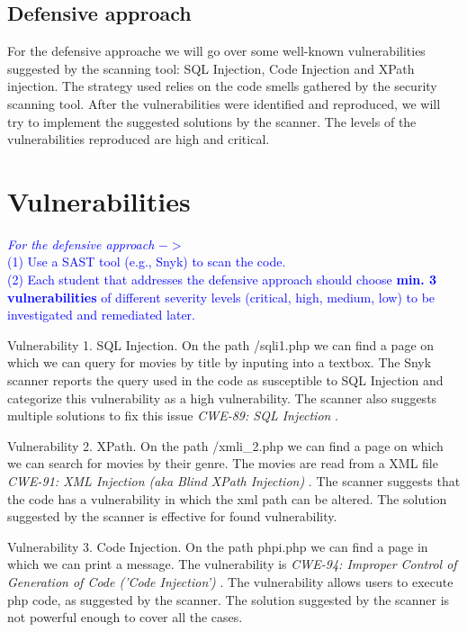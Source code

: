\documentclass{article}
\begin{document}
\subsection{Defensive approach}
\par For the defensive approache we will go over some well-known vulnerabilities suggested by the scanning tool: SQL Injection, Code Injection and XPath injection. The strategy used relies on the code smells gathered by the security scanning tool. After the vulnerabilities were identified and reproduced, we will try to implement the suggested solutions by the scanner. The levels of the vulnerabilities reproduced are high and critical.

\section{Vulnerabilities}
\label{}

\textcolor{blue}{\textit{For the defensive approach} $->$ \\(1) Use a SAST tool (e.g., Snyk) to scan the code.\\
    (2) Each student that addresses the defensive approach should choose \textbf{min. 3 vulnerabilities} of different severity levels (critical, high, medium, low) to be investigated and remediated later.}
\par Vulnerability 1. SQL Injection. On the path /sqli1.php we can find a page on which we can query for movies by title by inputing into a textbox. The Snyk scanner reports the query used in the code as susceptible to SQL Injection and categorize this vulnerability as a high vulnerability. The scanner also suggests multiple solutions to fix this issue \textit{CWE-89: SQL Injection}  \cite{Vuln001}.
\par Vulnerability 2. XPath. On the path /xmli\_2.php we can find a page on which we can search for movies by their genre. The movies are read from a XML file \textit{CWE-91: XML Injection (aka Blind XPath Injection)} \cite{vul:xpath}. The scanner suggests that the code has a vulnerability in which the xml path can be altered. The solution suggested by the scanner is effective for found vulnerability.
\par Vulnerability 3. Code Injection. On the path phpi.php we can find a page in which we can print a message. The vulnerability is \textit{
CWE-94: Improper Control of Generation of Code ('Code Injection')} \cite{vul:code-injection}. The vulnerability allows users to execute php code, as suggested by the scanner. The solution suggested by the scanner is not powerful enough to cover all the cases.
\end{document}

